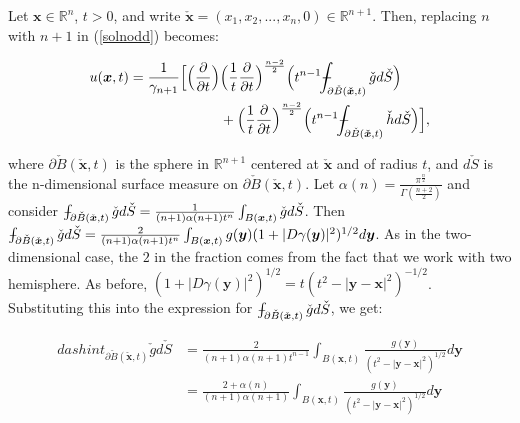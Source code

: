 \documentclass[a4paper, 12pt]{article}
\def\Xint#1{\mathchoice
{\XXint\displaystyle\textstyle{#1}}%
{\XXint\textstyle\scriptstyle{#1}}%
{\XXint\scriptstyle\scriptscriptstyle{#1}}%
{\XXint\scriptscriptstyle\scriptscriptstyle{#1}}%
\!\int}
\def\XXint#1#2#3{{\setbox0=\hbox{$#1{#2#3}{\int}$ }
\vcenter{\hbox{$#2#3$ }}\kern-.6\wd0}}
\def\dashint{\Xint-}
\numberwithin{equation}{section}
\begin{document}
Let $\boldsymbol{x} \in \mathbb{R}^n$, $t>0$, and write
$\check{\boldsymbol{x}}=(x_1, x_2, ..., x_n, 0) \in \mathbb{R}^{n+1}$. Then,
replacing $n$ with $n+1$ in (\ref{solnodd}) becomes:

\begin{equation} \label{solneven}
    \begin{split}
        u(\boldsymbol{x}, t)=\frac{1}{\gamma_{n+1}}\Big[\Big(\diffp[1]{}{t}\Big) & \Big(\frac{1}{t} \diffp[1]{}{t} \Big)^{\frac{n-2}{2}}\Big(t^{n-1} \dashint_{\partial \check{B}(\boldsymbol{\check{x}},t)}\check{g}d\check{S} \Big)\\
        &+ \Big(\frac{1}{t} \diffp[1]{}{t} \Big)^{\frac{n-2}{2}}\Big(t^{n-1} \dashint_{\partial \check{B}(\boldsymbol{\check{x}},t)}\check{h}d\check{S} \Big)\Big],
    \end{split}
\end{equation} 

 where $\partial \check{B}(\boldsymbol{\check{x}},t)$ is the sphere in
 $\mathbb{R}^{n+1}$ centered at $\boldsymbol{\check{x}}$ and of radius $t$, and
 $d\check{S}$ is the n-dimensional surface measure on $\partial
 \check{B}(\boldsymbol{\check{x}},t)$. Let
 $\alpha(n)=\frac{\pi^{\frac{n}{2}}}{\Gamma(\frac{n+2}{2})}$ and consider
 $\dashint_{\partial \check{B}(\check{\boldsymbol{x}}, t)}
 \check{g}d\check{S}=\frac{1}{(n+1)\alpha(n+1)t^n}\int_{B(\boldsymbol{x},t)}\check{g}d\check{S}$.
 Then $\dashint_{\partial \check{B}(\check{\boldsymbol{x}}, t)}
 \check{g}d\check{S}=\frac{2}{(n+1)\alpha(n+1)t^n}\int_{B(\boldsymbol{x},t)}g(\boldsymbol{y})(1+|D\gamma(\boldsymbol{y})|^2)^{1/2}d\boldsymbol{y}$.
 As in the two-dimensional case, the $2$ in the fraction comes from the fact
 that we work with two hemisphere. As before, $(1+|D\gamma
 (\boldsymbol{y})|^2)^{1/2}=t(t^2-|\boldsymbol{y}-\boldsymbol{x}|^2)^{-1/2}$.
 Substituting this into the expression for $\dashint_{\partial
 \check{B}(\check{\boldsymbol{x}}, t)} \check{g}d\check{S}$, we get:

 \begin{equation*}
    \begin{aligned}
        dashint_{\partial \check{B}(\check{\boldsymbol{x}}, t)} \check{g}d\check{S}&=\frac{2}{(n+1)\alpha(n+1)t^{n-1}}\int_{B(\boldsymbol{x},t)}\frac{g(\boldsymbol{y})}{(t^2-|\boldsymbol{y}-\boldsymbol{x}|^2)^{1/2}}d\boldsymbol{y}\\
        &=\frac{2+\alpha(n)}{(n+1)\alpha(n+1)}\int_{B(\boldsymbol{x},t)}\frac{g(\boldsymbol{y})}{(t^2-|\boldsymbol{y}-\boldsymbol{x}|^2)^{1/2}}d \boldsymbol{y}
    \end{aligned}
\end{equation*}
\end{document}
